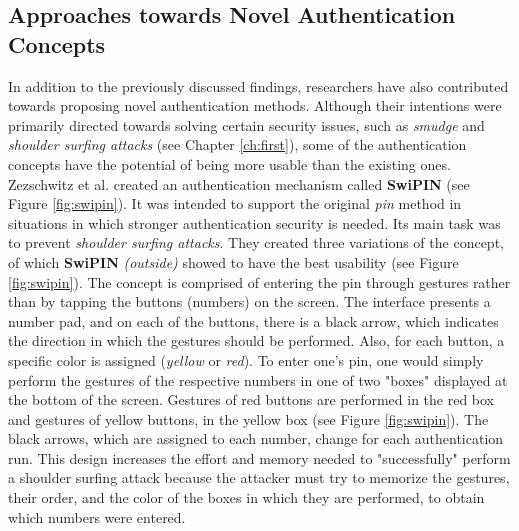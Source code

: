 \subsection{Approaches towards Novel Authentication Concepts} \label{2.2.3}

In addition to the previously discussed findings, researchers have also contributed towards proposing novel authentication methods. Although their intentions were primarily directed towards solving certain security issues, such as \textit{smudge} and \textit{shoulder surfing attacks} (see Chapter \ref{ch:first}), some of the authentication concepts have the potential of being more usable than the existing ones.\\

Zezschwitz et al. \cite{Swipin} created an authentication mechanism called \textbf{SwiPIN} (see Figure \ref{fig:swipin}). It was intended to support the original \textit{pin} method in situations in which stronger authentication security is needed. Its main task was to prevent \textit{shoulder surfing attacks}. They created three variations of the concept, of which \textbf{SwiPIN} \textit{(outside)} showed to have the best usability (see Figure \ref{fig:swipin}). The concept is comprised of entering the pin through gestures rather than by tapping the buttons (numbers) on the screen. The interface presents a number pad, and on each of the buttons, there is a black arrow, which indicates the direction in which the gestures should be performed. Also, for each button, a specific color is assigned (\textit{yellow} or \textit{red}). To enter one's pin, one would simply perform the gestures of the respective numbers in one of two "boxes" displayed at the bottom of the screen. Gestures of red buttons are performed in the red box and gestures of yellow buttons, in the yellow box (see Figure \ref{fig:swipin}). The black arrows, which are assigned to each number, change for each authentication run. This design increases the effort and memory needed to "successfully" perform a shoulder surfing attack because the attacker must try to memorize the gestures, their order, and the color of the boxes in which they are performed, to obtain which numbers were entered. \\

